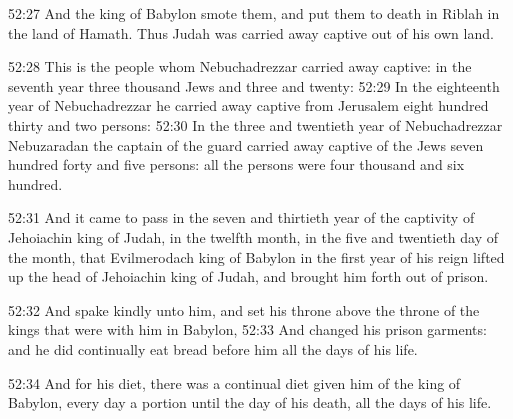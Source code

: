 52:27 And the king of Babylon smote them, and put them to death in
Riblah in the land of Hamath. Thus Judah was carried away captive out
of his own land.

52:28 This is the people whom Nebuchadrezzar carried away captive: in
the seventh year three thousand Jews and three and twenty: 52:29 In
the eighteenth year of Nebuchadrezzar he carried away captive from
Jerusalem eight hundred thirty and two persons: 52:30 In the three and
twentieth year of Nebuchadrezzar Nebuzaradan the captain of the guard
carried away captive of the Jews seven hundred forty and five persons:
all the persons were four thousand and six hundred.

52:31 And it came to pass in the seven and thirtieth year of the
captivity of Jehoiachin king of Judah, in the twelfth month, in the
five and twentieth day of the month, that Evilmerodach king of Babylon
in the first year of his reign lifted up the head of Jehoiachin king
of Judah, and brought him forth out of prison.

52:32 And spake kindly unto him, and set his throne above the throne
of the kings that were with him in Babylon, 52:33 And changed his
prison garments: and he did continually eat bread before him all the
days of his life.

52:34 And for his diet, there was a continual diet given him of the
king of Babylon, every day a portion until the day of his death, all
the days of his life.

